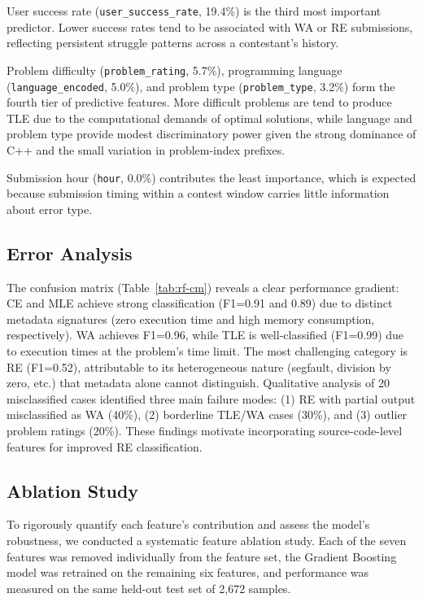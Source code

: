 \documentclass[10pt,a4paper]{article}
\begin{document}
User success rate (\texttt{user\_success\_rate}, 19.4\%) is the third most
important predictor. Lower success rates tend to be associated with WA or RE
submissions, reflecting persistent struggle patterns across a contestant's
history.

Problem difficulty (\texttt{problem\_rating}, 5.7\%), programming language
(\texttt{language\_encoded}, 5.0\%), and problem type (\texttt{problem\_type},
3.2\%) form the fourth tier of predictive features. More difficult problems are
tend to produce TLE due to the computational demands of optimal
solutions, while language and problem type provide modest discriminatory power
given the strong dominance of C++ and the small variation in problem-index
prefixes.

Submission hour (\texttt{hour}, 0.0\%) contributes the least importance, which
is expected because submission timing within a contest window carries little
information about error type.


\subsection{Error Analysis}

The confusion matrix (Table~\ref{tab:rf-cm}) reveals a clear performance gradient: CE and MLE achieve strong classification (F1=0.91 and 0.89) due to distinct metadata signatures (zero execution time and high memory consumption, respectively). WA achieves F1=0.96, while TLE is well-classified (F1=0.99) due to execution times at the problem's time limit. The most challenging category is RE (F1=0.52), attributable to its heterogeneous nature (segfault, division by zero, etc.) that metadata alone cannot distinguish. Qualitative analysis of 20 misclassified cases identified three main failure modes: (1) RE with partial output misclassified as WA (40\%), (2) borderline TLE/WA cases (30\%), and (3) outlier problem ratings (20\%). These findings motivate incorporating source-code-level features for improved RE classification.

\subsection{Ablation Study}
\label{sec:ablation}

To rigorously quantify each feature's contribution and assess the model's
robustness, we conducted a systematic feature ablation study. Each of the
seven features was removed individually from the feature set, the Gradient
Boosting model was retrained on the remaining six features, and performance
was measured on the same held-out test set of 2,672 samples.
\end{document}
